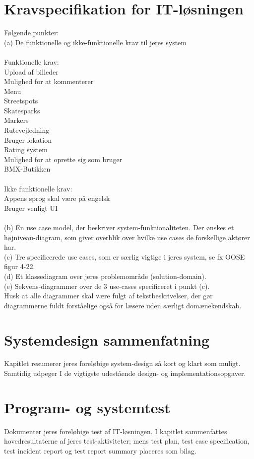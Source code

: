 \documentclass[12pt]{article}
\begin{document}
\pagebreak

\section{Kravspecifikation for IT-løsningen}
Følgende punkter:\\
(a) De funktionelle og ikke-funktionelle krav til jeres system\\\\
Funktionelle krav:\\
Upload af billeder\\
Mulighed for at kommenterer\\
Menu\\
Streetspots\\
Skatesparks\\
Markers\\
Rutevejledning\\
Bruger lokation\\
Rating system\\
Mulighed for at oprette sig som bruger\\
BMX-Butikken\\\\
Ikke funktionelle krav:\\
Appens sprog skal være på engelsk\\
Bruger venligt UI\\\\
(b) En use case model, der beskriver system-funktionaliteten. Der ønskes et højniveau-diagram,
som giver overblik over hvilke use cases de forskellige aktører har.\\
(c) Tre specificerede use cases, som er særlig vigtige i jeres system, se fx OOSE figur 4-22.\\
(d) Et klassediagram over jeres problemområde (solution-domain).\\
(e) Sekvens-diagrammer over de 3 use-cases specificeret i punkt (c).\\
Husk at alle diagrammer skal være fulgt af tekstbeskrivelser, der gør diagrammerne fuldt
forståelige også for læsere uden særligt domænekendskab.

\section{Systemdesign sammenfatning}
Kapitlet resumerer jeres foreløbige system-design så kort og klart som muligt. Samtidig
udpeger I de vigtigste udestående design- og implementationsopgaver.

\section{Program- og systemtest}
Dokumenter jeres foreløbige test af IT-løsningen. I kapitlet sammenfattes hovedresultaterne af
jeres test-aktiviteter; mens test plan, test case specification, test incident report og test report
summary placeres som bilag.
\end{document}
